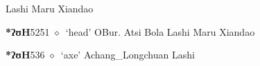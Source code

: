 \begin{list}{}{\leftmargin=1.5em \itemindent=-1.5em}
\hspace{1ex}
         Lashi 
\hspace{1ex}
         Maru 
\hspace{1ex}
         Xiandao 
  \item {\footnotesize \textbf{*ʔʊH}}{\tiny 5251}
\hspace{1ex}
         $\diamond$~`head'
         OBur. 
\hspace{1ex}
         Atsi 
\hspace{1ex}
         Bola 
\hspace{1ex}
         Lashi 
\hspace{1ex}
         Maru 
\hspace{1ex}
         Xiandao 
  \item {\footnotesize \textbf{*ʔʊH}}{\tiny 536}
\hspace{1ex}
         $\diamond$~`axe'
         Achang\_Longchuan 
\hspace{1ex}
         Lashi 
  \end{list}
